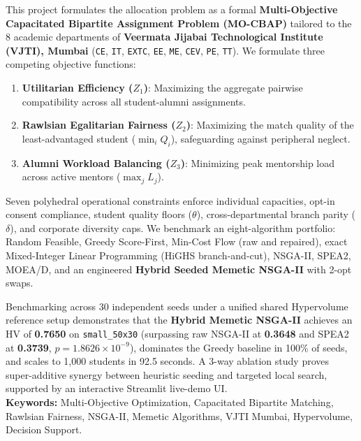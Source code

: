 \documentclass[11pt,a4paper,oneside]{report}
\begin{document}
This project formulates the allocation problem as a formal \textbf{Multi-Objective Capacitated Bipartite Assignment Problem (MO-CBAP)} tailored to the 8 academic departments of \textbf{Veermata Jijabai Technological Institute (VJTI), Mumbai} (\texttt{CE}, \texttt{IT}, \texttt{EXTC}, \texttt{EE}, \texttt{ME}, \texttt{CEV}, \texttt{PE}, \texttt{TT}). We formulate three competing objective functions:
\begin{enumerate}
    \item \textbf{Utilitarian Efficiency ($Z_1$)}: Maximizing the aggregate pairwise compatibility across all student-alumni assignments.
    \item \textbf{Rawlsian Egalitarian Fairness ($Z_2$)}: Maximizing the match quality of the least-advantaged student ($\min_i Q_i$), safeguarding against peripheral neglect.
    \item \textbf{Alumni Workload Balancing ($Z_3$)}: Minimizing peak mentorship load across active mentors ($\max_j L_j$).
\end{enumerate}

Seven polyhedral operational constraints enforce individual capacities, opt-in consent compliance, student quality floors ($\theta$), cross-departmental branch parity ($\delta$), and corporate diversity caps. We benchmark an eight-algorithm portfolio: Random Feasible, Greedy Score-First, Min-Cost Flow (raw and repaired), exact Mixed-Integer Linear Programming (HiGHS branch-and-cut), NSGA-II, SPEA2, MOEA/D, and an engineered \textbf{Hybrid Seeded Memetic NSGA-II} with 2-opt swaps.

Benchmarking across 30 independent seeds under a unified shared Hypervolume reference setup demonstrates that the \textbf{Hybrid Memetic NSGA-II} achieves an HV of \textbf{0.7650} on \texttt{small\_50x30} (surpassing raw NSGA-II at \textbf{0.3648} and SPEA2 at \textbf{0.3739}, $p = 1.8626 \times 10^{-9}$), dominates the Greedy baseline in 100\% of seeds, and scales to 1,000 students in 92.5 seconds. A 3-way ablation study proves super-additive synergy between heuristic seeding and targeted local search, supported by an interactive Streamlit live-demo UI.\\[0.6cm]

\noindent\textbf{Keywords:} Multi-Objective Optimization, Capacitated Bipartite Matching, Rawlsian Fairness, NSGA-II, Memetic Algorithms, VJTI Mumbai, Hypervolume, Decision Support.

\newpage

\tableofcontents
\newpage
\listoffigures
\vspace{0.8cm}
\listoftables
\newpage
{}
\end{document}
